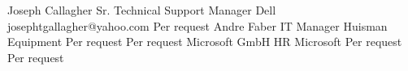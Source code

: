 %
%
%


\begin{referees}
		{Joseph Callagher}
		{Sr. Technical Support Manager}
		{Dell}
		{josephtgallagher@yahoo.com}
		{Per request}
		{Andre Faber}
		{IT Manager}
		{Huisman Equipment}
		{Per request}
		{Per request}
		{Microsoft GmbH}
		{HR}
		{Microsoft}
		{Per request}
		{Per request }
\end{referees}
